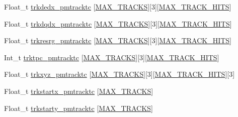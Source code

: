 \begin{DoxyCompactItemize}
Float\-\_\-t \hyperlink{classanatree_a18ee2ecb81bb2a92724ff7e2b16d3044}{trkdedx\-\_\-pmtracktc} \mbox{[}\hyperlink{anatree__core__v09410002_8h_a327fd4e796e4a0d78947524c96e4362e}{M\-A\-X\-\_\-\-T\-R\-A\-C\-K\-S}\mbox{]}\mbox{[}3\mbox{]}\mbox{[}\hyperlink{anatree__core__v09410002_8h_ae75eb9050f16aa034339f05572523070}{M\-A\-X\-\_\-\-T\-R\-A\-C\-K\-\_\-\-H\-I\-T\-S}\mbox{]}
\item 
Float\-\_\-t \hyperlink{classanatree_aa4e8ceac389407e64b9a5301f3762604}{trkdqdx\-\_\-pmtracktc} \mbox{[}\hyperlink{anatree__core__v09410002_8h_a327fd4e796e4a0d78947524c96e4362e}{M\-A\-X\-\_\-\-T\-R\-A\-C\-K\-S}\mbox{]}\mbox{[}3\mbox{]}\mbox{[}\hyperlink{anatree__core__v09410002_8h_ae75eb9050f16aa034339f05572523070}{M\-A\-X\-\_\-\-T\-R\-A\-C\-K\-\_\-\-H\-I\-T\-S}\mbox{]}
\item 
Float\-\_\-t \hyperlink{classanatree_a0f4da8ade2fa111900058c274e9d099a}{trkresrg\-\_\-pmtracktc} \mbox{[}\hyperlink{anatree__core__v09410002_8h_a327fd4e796e4a0d78947524c96e4362e}{M\-A\-X\-\_\-\-T\-R\-A\-C\-K\-S}\mbox{]}\mbox{[}3\mbox{]}\mbox{[}\hyperlink{anatree__core__v09410002_8h_ae75eb9050f16aa034339f05572523070}{M\-A\-X\-\_\-\-T\-R\-A\-C\-K\-\_\-\-H\-I\-T\-S}\mbox{]}
\item 
Int\-\_\-t \hyperlink{classanatree_a4f72a32de56ea4acabed5f7af36de5fb}{trktpc\-\_\-pmtracktc} \mbox{[}\hyperlink{anatree__core__v09410002_8h_a327fd4e796e4a0d78947524c96e4362e}{M\-A\-X\-\_\-\-T\-R\-A\-C\-K\-S}\mbox{]}\mbox{[}3\mbox{]}\mbox{[}\hyperlink{anatree__core__v09410002_8h_ae75eb9050f16aa034339f05572523070}{M\-A\-X\-\_\-\-T\-R\-A\-C\-K\-\_\-\-H\-I\-T\-S}\mbox{]}
\item 
Float\-\_\-t \hyperlink{classanatree_ab16b7f14f5e6fca149d74f529415da6a}{trkxyz\-\_\-pmtracktc} \mbox{[}\hyperlink{anatree__core__v09410002_8h_a327fd4e796e4a0d78947524c96e4362e}{M\-A\-X\-\_\-\-T\-R\-A\-C\-K\-S}\mbox{]}\mbox{[}3\mbox{]}\mbox{[}\hyperlink{anatree__core__v09410002_8h_ae75eb9050f16aa034339f05572523070}{M\-A\-X\-\_\-\-T\-R\-A\-C\-K\-\_\-\-H\-I\-T\-S}\mbox{]}\mbox{[}3\mbox{]}
\item 
Float\-\_\-t \hyperlink{classanatree_aee4d66a2840c225fdf8f5e2852959cff}{trkstartx\-\_\-pmtracktc} \mbox{[}\hyperlink{anatree__core__v09410002_8h_a327fd4e796e4a0d78947524c96e4362e}{M\-A\-X\-\_\-\-T\-R\-A\-C\-K\-S}\mbox{]}
\item 
Float\-\_\-t \hyperlink{classanatree_aa1fbfa3b3483659eea7d6c5c814e682b}{trkstarty\-\_\-pmtracktc} \mbox{[}\hyperlink{anatree__core__v09410002_8h_a327fd4e796e4a0d78947524c96e4362e}{M\-A\-X\-\_\-\-T\-R\-A\-C\-K\-S}\mbox{]}

\end{DoxyCompactItemize}
